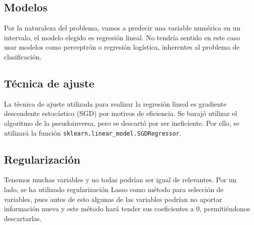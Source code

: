 \documentclass[a4paper, 20pt]{article}
\begin{document}
\subsection{Modelos}
Por la naturaleza del problema, vamos a predecir una variable numérica en un intervalo, el modelo elegido es regresión lineal. No tendría sentido en este caso usar modelos como perceptrón o regresión logística, inherentes al problema de clasificación.

\subsection{Técnica de ajuste}

La técnica de ajuste utilizada para realizar la regresión lineal es gradiente descendente estocástico (SGD) por motivos de eficiencia. Se barajó utilizar el algoritmo de la pseudoinversa, pero se descartó por ser ineficiente. Por ello, se utilizará la función \texttt{sklearn.linear\_model.SGDRegressor}.


\subsection{Regularización}
Tenemos muchas variables y no todas podrían ser igual de relevantes. Por un lado, se ha utilizado regularización Lasso como método para selección de variables, pues antes de esto algunas de las variables podrían no aportar información nueva y este método hará tender sus coeficientes a 0, permitiéndonos descartarlas.
\end{document}

